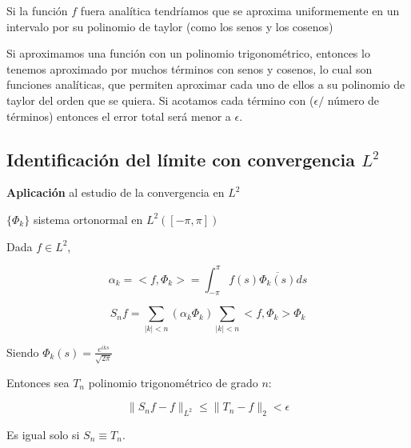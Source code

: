 		Si la función $f$ fuera analítica tendríamos que se aproxima uniformemente en un intervalo por su polinomio de taylor (como los senos y los cosenos)

		Si aproximamos una función con un polinomio trigonométrico, entonces lo tenemos aproximado por muchos términos con senos y cosenos, lo cual son funciones analíticas, que permiten aproximar cada uno de ellos a su polinomio de taylor del orden que se quiera. Si acotamos cada término con ($\epsilon / $ número de términos) entonces el error total será menor a $\epsilon$.

		\subsection{Identificación del límite con convergencia $L^2$}
		\textbf{Aplicación} al estudio de la convergencia en $L^2$

		$\{\Phi_k\}$ sistema ortonormal en $L^2([-\pi,\pi])$

		Dada $f \in L^2$,

		\[\alpha_k = <f, \Phi_{k}> = \int_{-\pi}^\pi f(s) \overline{\Phi_k(s)} ds  \]

		\[  S_n f = \sum_{|k| < n} (\alpha_k \Phi_k ) \sum_{|k| < n}<f, \Phi_k >\Phi_k \]

		Siendo $\Phi_k(s) = \frac{e^{iks}}{\sqrt{2\pi}}$

		\begin{theorem}

			Entonces sea $T_n$ polinomio trigonométrico de grado $n$:

			\[ \| S_n f - f\|_{L^2} \leq \| T_n - f \|_2 < \epsilon \]

			Es igual solo si $S_n \equiv T_n$.

		\end{theorem}


